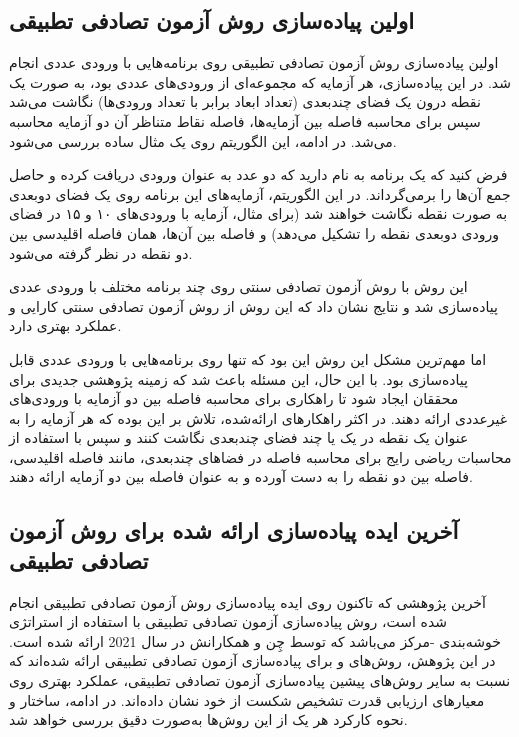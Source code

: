 \subsection{اولین پیاده‌سازی روش آزمون تصادفی تطبیقی}
اولین پیاده‌سازی روش آزمون تصادفی تطبیقی \cite{chen2001proportional} روی برنامه‌هایی با ورودی عددی انجام شد. در این پیاده‌سازی، هر آزمایه که مجموعه‌ای از ورودی‌های عددی بود، به صورت یک نقطه درون یک فضای چندبعدی (تعداد ابعاد برابر با تعداد ورودی‌ها) نگاشت می‌شد سپس برای محاسبه فاصله بین آزمایه‌ها، فاصله نقاط متناظر آن دو آزمایه محاسبه می‌شد. در ادامه، این الگوریتم روی یک مثال ساده بررسی می‌شود.

فرض کنید که یک برنامه به نام  دارید که دو عدد به عنوان ورودی دریافت کرده و حاصل جمع آن‌ها را برمی‌گرداند. در این الگوریتم، آزمایه‌های این برنامه روی یک فضای دوبعدی به صورت نقطه نگاشت خواهند شد (برای مثال، آزمایه با ورودی‌های ۱۰ و ۱۵ در فضای ورودی دوبعدی نقطه  را تشکیل می‌دهد) و فاصله بین آن‌ها، همان فاصله اقلیدسی بین دو نقطه در نظر گرفته می‌شود.

این روش با روش آزمون تصادفی سنتی روی چند برنامه مختلف با ورودی عددی پیاده‌سازی شد و نتایج نشان داد که این روش از روش آزمون تصادفی سنتی کارایی و عملکرد بهتری دارد.

اما مهم‌ترین مشکل این روش این بود که تنها روی برنامه‌هایی با ورودی عددی قابل پیاده‌سازی بود. با این حال، این مسئله باعث شد که زمینه پژوهشی جدیدی برای محققان ایجاد شود تا راهکاری برای محاسبه فاصله بین دو آزمایه با ورودی‌های غیرعددی ارائه دهند. در اکثر راهکارهای ارائه‌شده، تلاش بر این بوده که هر آزمایه را به عنوان یک نقطه در یک یا چند فضای چندبعدی نگاشت کنند و سپس با استفاده از محاسبات ریاضی رایج برای محاسبه فاصله در فضاهای چندبعدی، مانند فاصله اقلیدسی، فاصله بین دو نقطه را به دست آورده و به عنوان فاصله بین دو آزمایه ارائه دهند.

\subsection{آخرین ایده پیاده‌سازی ارائه شده برای روش آزمون تصادفی تطبیقی}

آخرین پژوهشی که تاکنون روی ایده پیاده‌سازی روش آزمون تصادفی تطبیقی انجام شده است، روش پیاده‌سازی آزمون تصادفی تطبیقی با استفاده از استراتژی خوشه‌بندی -مرکز می‌باشد که توسط چِن و همکارانش در سال 2021 ارائه شده است. در این پژوهش، روش‌های  و  برای پیاده‌سازی آزمون تصادفی تطبیقی ارائه شده‌اند که نسبت به سایر روش‌های پیشین پیاده‌سازی آزمون تصادفی تطبیقی، عملکرد بهتری روی معیارهای ارزیابی قدرت تشخیص شکست از خود نشان داده‌اند. در ادامه، ساختار و نحوه کارکرد هر یک از این روش‌ها به‌صورت دقیق بررسی خواهد شد.

